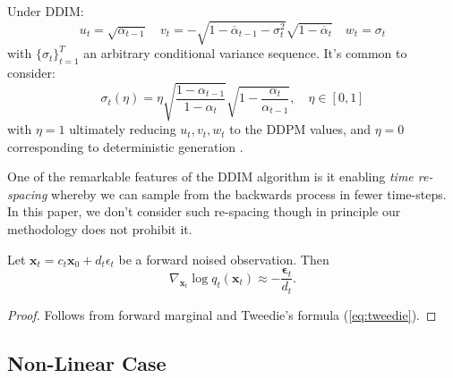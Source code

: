 \begin{remark} \label{rem:ddim}
    Under DDIM:
    \begin{equation*}
        u_t = \sqrt{\alpha_{t-1}} \quad
        v_t = -\sqrt{1 - \overline{\alpha}_{t-1} - \sigma_t^2}\sqrt{1 - \overline{\alpha}_t} \quad
        w_t = \sigma_t
    \end{equation*}
    with $\{\sigma_t\}_{t=1}^T$ an arbitrary conditional variance sequence. It's common to consider:
    \begin{equation*}
        \sigma_t(\eta) = \eta\sqrt{\frac{1 - \alpha_{t-1}}{1 - \alpha_t}}\sqrt{1 - \frac{\alpha_t}{\alpha_{t-1}}},\quad \eta \in [0,1]
    \end{equation*}
    with $\eta=1$ ultimately reducing $u_t, v_t, w_t$ to the DDPM values, and $\eta=0$ corresponding
    to deterministic generation \parencite{songDenoisingDiffusionImplicit2020}.
\end{remark}

\begin{remark}
    One of the remarkable features of the DDIM algorithm is it enabling \emph{time re-spacing}
    whereby we can sample from the backwards process in fewer time-steps. In this paper, we don't
    consider such re-spacing though in principle our methodology does not prohibit it.
\end{remark}

\begin{proposition} \label{prop:score-to-noise}
    Let $\mathbf{x}_t = c_t\mathbf{x}_0 + d_t\epsilon_t$ be a forward noised observation. Then
    $$
    \nabla_{\mathbf{x}_t} \log q_t(\mathbf{x}_t) \approx -\frac{\mathbf{\epsilon}_t}{d_t}.
    $$
\end{proposition}
\begin{proof}
    Follows from forward marginal and Tweedie's formula (\autoref{eq:tweedie}).
\end{proof}

\subsection{Non-Linear Case}

